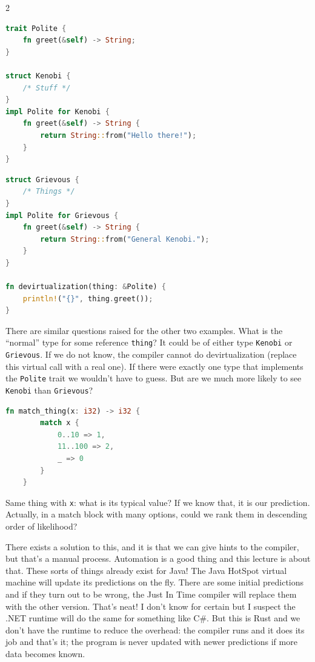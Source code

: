 \begin{multicols}{2}
\begin{lstlisting}[language=Rust]
trait Polite {
    fn greet(&self) -> String;
}

struct Kenobi {
    /* Stuff */
}
impl Polite for Kenobi {
    fn greet(&self) -> String {
        return String::from("Hello there!");
    }
}
\end{lstlisting}
\columnbreak
\begin{lstlisting}[language=Rust]
struct Grievous {
    /* Things */
}
impl Polite for Grievous {
    fn greet(&self) -> String {
        return String::from("General Kenobi.");
    }
}

fn devirtualization(thing: &Polite) {
    println!("{}", thing.greet());
}

\end{lstlisting}
\end{multicols}



There are similar questions raised for the other two examples. What is the ``normal'' type for some reference \texttt{thing}? It could be of either type \texttt{Kenobi} or \texttt{Grievous}. If we do not know, the compiler cannot do devirtualization (replace this virtual call with a real one). If there were exactly one type that implements the \texttt{Polite} trait we wouldn't have to guess. But are we much more likely to see \texttt{Kenobi} than \texttt{Grievous}?

\begin{lstlisting}[language=Rust]
    fn match_thing(x: i32) -> i32 {
        match x {
            0..10 => 1,
            11..100 => 2,
            _ => 0
        }
    }
\end{lstlisting}

 Same thing with \texttt{x}: what is its typical value? If we know that, it is our prediction. Actually, in a match block with many options, could we rank them in descending order of likelihood?

There exists a solution to this, and it is that we can give hints to the compiler, but that's a manual process. Automation is a good thing and this lecture is about that. These sorts of things already exist for Java! The Java HotSpot virtual machine will update its predictions on the fly. There are some initial predictions and if they turn out to be wrong, the Just In Time compiler will replace them with the other version. That's neat! I don't know for certain but I suspect the .NET runtime will do the same for something like C\#. But this is Rust and we don't have the runtime to reduce the overhead: the compiler runs and it does its job and that's it; the program is never updated with newer predictions if more data becomes known.

